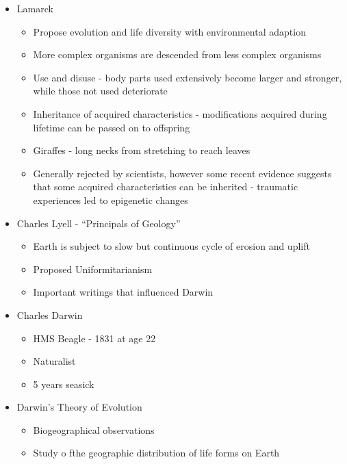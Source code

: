 \documentclass[12pt]{article}
\begin{document}
\begin{itemize}
\begin{itemize}
\begin{itemize}
                \item Lamarck
                \begin{itemize}
                    \item Propose evolution and life diversity with environmental adaption
                    \item More complex organisms are descended from less complex organisms
                    \item Use and disuse - body parts used extensively become larger and stronger, while those not used deteriorate
                    \item Inheritance of acquired characteristics - modifications acquired during lifetime can be passed on to offspring
                    \item Giraffes - long necks from stretching to reach leaves
                    \item Generally rejected by scientists, however some recent evidence suggests that some acquired characteristics can be inherited - traumatic experiences led to epigenetic changes
                \end{itemize}
                \item Charles Lyell - ``Principals of Geology''
                \begin{itemize}
                    \item Earth is subject to slow but continuous cycle of erosion and uplift
                    \item Proposed Uniformitarianism
                    \item Important writings that influenced Darwin
                \end{itemize}
                \item Charles Darwin
                \begin{itemize}
                    \item HMS Beagle - 1831 at age 22
                    \item Naturalist
                    \item 5 years seasick
                \end{itemize}
                \item Darwin's Theory of Evolution
                \begin{itemize}
                    \item Biogeographical observations
                    \item Study o fthe geographic distribution of life forms on Earth

\end{itemize}
\end{itemize}
\end{itemize}
\end{itemize}
\end{document}
